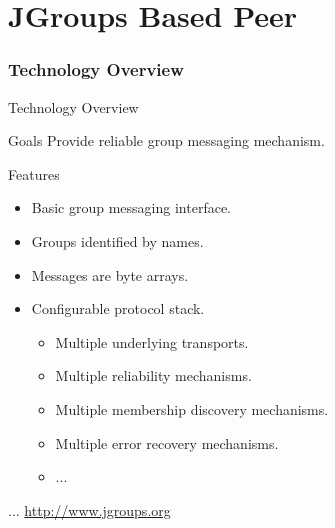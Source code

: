 \part{JGroups Based Peer}


\section{Technology Overview}


\begin{frame}{Technology Overview}
    \begin{block}{Goals}
        Provide reliable group messaging mechanism.
    \end{block}

    \bigskip

    \begin{block}{Features}
        \begin{itemize}
            \item Basic group messaging interface.
            \item Groups identified by names.
            \item Messages are byte arrays.
            \item Configurable protocol stack.
            \begin{itemize}
                \item Multiple underlying transports.
                \item Multiple reliability mechanisms.
                \item Multiple membership discovery mechanisms.
                \item Multiple error recovery mechanisms.
                \item ...
            \end{itemize}
        \end{itemize}
    \end{block}

    \bigskip

    \hfill ... \url{http://www.jgroups.org}
\end{frame}


